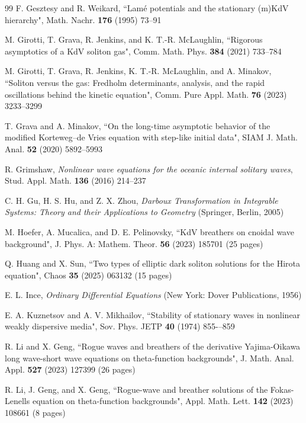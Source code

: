 \documentclass[12pt,reqno]{amsart}
\numberwithin{equation}{section}
\begin{document}
\begin{thebibliography}{99}
	 F. Gesztesy and R. Weikard, ``Lam{\'e} potentials and the stationary (m){K}d{V} hierarchy", Math. Nachr. {\bf 176} (1995) 73--91
	
	 M. Girotti, T. Grava, R. Jenkins, and K. T.-R. McLaughlin,
	``Rigorous asymptotics of a KdV soliton gas", 
	Comm. Math. Phys. {\bf 384} (2021)  733--784
	
	 M. Girotti, T. Grava, R. Jenkins, K. T.-R. McLaughlin, and 
	A. Minakov, ``Soliton versus the gas: Fredholm determinants, analysis, and the rapid oscillations behind the kinetic equation", 
	Comm. Pure Appl. Math. {\bf 76} (2023) 3233--3299
	
	 T. Grava and A. Minakov, ``On the long-time asymptotic behavior of the modified Korteweg–de Vries equation with step-like initial data", SIAM J. Math. Anal. {\bf 52} (2020) 5892--5993
	
	 R. Grimshaw, \textit{Nonlinear wave equations for the oceanic internal solitary waves}, 
	Stud. Appl. Math. {\bf 136} (2016) 214--237
	
 C. H. Gu, H. S. Hu, and Z. X. Zhou, {\em Darboux Transformation in Integrable Systems: Theory and their Applications to Geometry} (Springer, Berlin, 2005)
	
	 M. Hoefer, A. Mucalica, and D. E. Pelinovsky, ``KdV breathers on cnoidal wave background", J. Phys. A: Mathem. Theor. {\bf 56} (2023) 185701 (25 pages)
	
	 Q. Huang and X. Sun, ``Two types of elliptic dark soliton solutions for the Hirota equation", Chaos {\bf 35} (2025) 063132 (15 pages)
	
	 E. L. Ince, {\em Ordinary Differential Equations} (New York: Dover Publications, 1956)
	
	 E. A. Kuznetsov and A. V. Mikhailov, ``Stability of stationary waves in nonlinear weakly dispersive media", 
	Sov. Phys. JETP {\bf 40} (1974) 855-–859
	
	 R. Li and X. Geng, ``Rogue waves and breathers of the derivative Yajima-Oikawa long wave-short wave equations on theta-function backgrounds", J. Math. Anal. Appl. {\bf 527} (2023) 127399 (26 pages)
	
	 R. Li, J. Geng, and X. Geng, ``Rogue-wave and breather solutions of the Fokas-Lenells equation on theta-function backgrounds",
	Appl. Math. Lett. {\bf 142} (2023)  108661 (8 pages)
	

\end{thebibliography}
\end{document}
